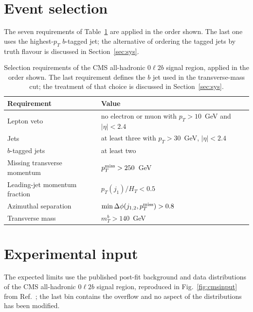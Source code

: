 \appendix
\section{Event selection}\label{app:sel}

The seven requirements of Table~\ref{tab:sel} are applied in the order shown. The last one uses
the highest-$p_T$ $b$-tagged jet; the alternative of ordering the tagged jets by truth flavour is
discussed in Section~\ref{sec:sys}.

\begin{table}[htbp]
\centering
\caption{Selection requirements of the CMS all-hadronic $0\ell2b$ signal region, applied in the order shown. The last requirement defines the $b$ jet used in the transverse-mass cut; the treatment of that choice is discussed in Section~\ref{sec:sys}.}
\label{tab:sel}
\begin{tabular}{ll}
\toprule
Requirement & Value \\
\midrule
Lepton veto & no electron or muon with $p_T>10$~GeV and $|\eta|<2.4$ \\
Jets & at least three with $p_T>30$~GeV, $|\eta|<2.4$ \\
$b$-tagged jets & at least two \\
Missing transverse momentum & $p_T^{\rm miss}>250$~GeV \\
Leading-jet momentum fraction & $p_T(j_1)/H_T<0.5$ \\
Azimuthal separation & $\min\Delta\phi(j_{1,2},p_T^{\rm miss})>0.8$ \\
Transverse mass & $m_T^b>140$~GeV \\
\bottomrule
\end{tabular}
\end{table}


\section{Experimental input}\label{app:input}

The expected limits use the published post-fit background and data distributions of the CMS
all-hadronic $0\ell2b$ signal region, reproduced in Fig.~\ref{fig:cmsinput} from
Ref.~\cite{CMS}; the last bin contains the overflow and no aspect of the distributions has been
modified.

